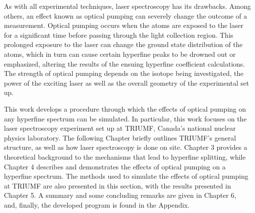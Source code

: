 As with all experimental techniques, laser spectroscopy has its drawbacks. Among others, an effect known as optical pumping can severely change the outcome of a measurement. Optical pumping occurs when the atoms are exposed to the laser for a significant time before passing through the light collection region. This prolonged exposure to the laser can change the ground state distribution of the atoms, which in turn can cause certain hyperfine peaks to be drowned out or emphasized, altering the results of the ensuing hyperfine coefficient calculations. The strength of optical pumping depends on the isotope being investigated, the power of the exciting laser as well as the overall geometry of the experimental set up.

This work develops a procedure through which the effects of optical pumping on any hyperfine spectrum can be simulated. In particular, this work focuses on the laser spectroscopy experiment set up at TRIUMF, Canada's national nuclear physics laboratory. The following Chapter briefly outlines TRIUMF's general structure, as well as how laser spectroscopy is done on site. Chapter 3 provides a theoretical background to the mechanisms that lead to hyperfine splitting, while Chapter 4 describes and demonstrates the effects of optical pumping on a hyperfine spectrum. The methods used to simulate the effects of optical pumping at TRIUMF are also presented in this section, with the results presented in Chapter 5. A summary and some concluding remarks are given in Chapter 6, and, finally, the developed program is found in the Appendix. 